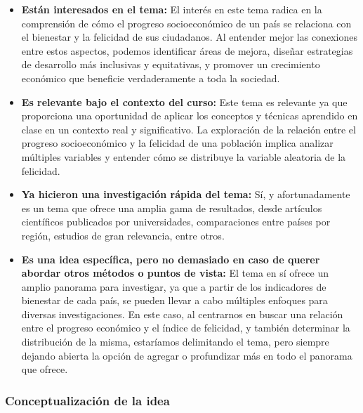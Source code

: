 \documentclass[12pt,oneside,letterpaper,spanish]{article}
\begin{document}
\begin{itemize}
    \item \textbf{Están interesados en el tema:} El interés en este tema radica en la comprensión de cómo el progreso socioeconómico de un país se relaciona con el bienestar y la felicidad de sus ciudadanos. Al entender mejor las conexiones entre estos aspectos, podemos identificar áreas de mejora, diseñar estrategias de desarrollo más inclusivas y equitativas, y promover un crecimiento económico que beneficie verdaderamente a toda la sociedad.

    \item \textbf{Es relevante bajo el contexto del curso:} Este tema es relevante ya que proporciona una oportunidad de aplicar los conceptos y técnicas aprendido en clase en un contexto real y significativo. La exploración de la relación entre el progreso socioeconómico y la felicidad de una población implica analizar múltiples variables y entender cómo se distribuye la variable aleatoria de la felicidad.

    \item \textbf{Ya hicieron una investigación rápida del tema:} Sí, y afortunadamente es un tema que ofrece una amplia gama de resultados, desde artículos científicos publicados por universidades, comparaciones entre países por región, estudios de gran relevancia, entre otros.

    \item \textbf{Es una idea específica, pero no demasiado en caso de querer abordar otros métodos o puntos de vista:} El tema en sí ofrece un amplio panorama para investigar, ya que a partir de los indicadores de bienestar de cada país, se pueden llevar a cabo múltiples enfoques para diversas investigaciones. En este caso, al centrarnos en buscar una relación entre el progreso económico y el índice de felicidad, y también determinar la distribución de la misma, estaríamos delimitando el tema, pero siempre dejando abierta la opción de agregar o profundizar más en todo el panorama que ofrece. 
\end{itemize}

\newpage
\subsubsection{Conceptualización de la idea}
\end{document}
